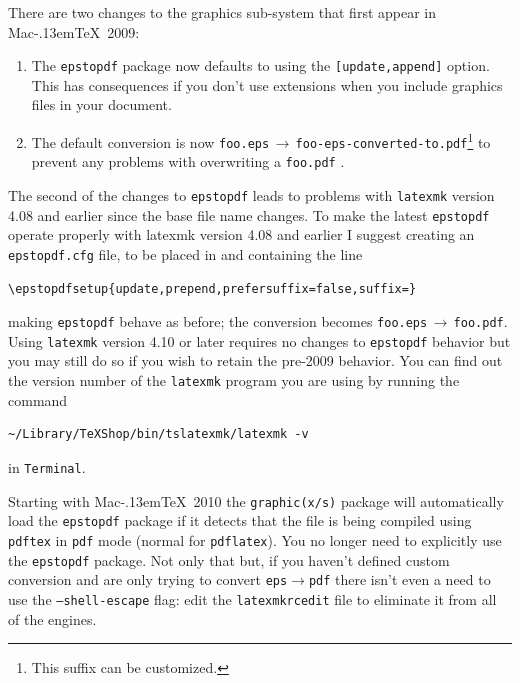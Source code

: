 \documentclass[11pt]{article}
\newcommand{\MacTeX}{Mac\kern-.13em\TeX}
\begin{document}
There are two changes to the graphics sub-system that first appear in \MacTeX\ 2009:
\begin{enumerate}
\item
The \texttt{epstopdf} package now defaults to using the \texttt{[update,append]} option. This has consequences if you don't use extensions when you include graphics files in your document.
\item
The default conversion is now \texttt{foo.eps}\,\(\to\)\,\texttt{foo-eps-converted-to.pdf}\footnote{This suffix can be customized.} to prevent any problems with overwriting a \texttt{foo.pdf} .
\end{enumerate}
The second of the changes to \texttt{epstopdf} leads to problems with \texttt{latexmk} version 4.08 and earlier since the base file name changes. To make the latest \texttt{epstopdf} operate properly with latexmk version 4.08 and earlier I suggest creating an \texttt{epstopdf.cfg} file, to be placed in  and containing the line
\begin{verbatim}
\epstopdfsetup{update,prepend,prefersuffix=false,suffix=}
\end{verbatim}
making \texttt{epstopdf} behave as before; the conversion becomes \texttt{foo.eps}\,\(\to\)\,\texttt{foo.pdf}. Using \texttt{latexmk} version 4.10 or later requires no changes to \texttt{epstopdf} behavior but you may still do so if you wish to retain the pre-2009 behavior. You can find out the version number of the \texttt{latexmk} program you are using by running the command
\begin{verbatim}
~/Library/TeXShop/bin/tslatexmk/latexmk -v
\end{verbatim}
in \texttt{Terminal}.

Starting with \MacTeX\ 2010 the \texttt{graphic(x/s)} package will automatically load the \texttt{epstopdf} package if it detects that the file is being compiled using \texttt{pdftex} in \texttt{pdf} mode (normal for \texttt{pdflatex}). You no longer need to explicitly use the \texttt{epstopdf} package. Not only that but, if you haven't defined custom conversion and are only trying to convert \texttt{eps}\(\to\)\texttt{pdf} there isn't even a need to use the \texttt{--shell-escape} flag: edit the \texttt{latexmkrcedit} file to eliminate it from all of the engines.
\end{document}
